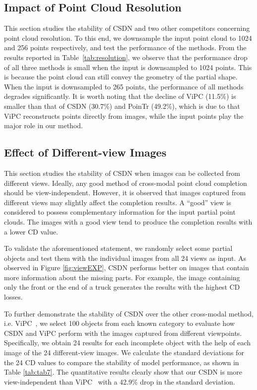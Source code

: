 \subsection{Impact of Point Cloud Resolution}
This section studies the stability of CSDN and two other competitors concerning point cloud resolution. 
To this end, we downsample the input point cloud to 1024 and 256 points respectively, and test the performance of the methods. From the results reported in Table~\ref{tab:resolution}, we observe that the performance drop of all three methods is small when the input is downsampled to 1024 points. This is because the point cloud can still convey the geometry of the partial shape. When the input is downsampled to 265 points, the performance of all methods degrades significantly. It is worth noting that the decline of ViPC (11.5\%) is smaller than that of CSDN (30.7\%) and PoinTr (49.2\%), which is due to that ViPC reconstructs points directly from images, while the input points play the major role in our method.

\subsection{Effect of Different-view Images}
\label{viewEXP}
This section studies the stability of CSDN when images can be collected from different views. Ideally, any good method of cross-modal point cloud completion should be view-independent. However, it is observed that images captured from different views may slightly affect the completion results. A ``good” view is considered to possess complementary information for the input partial point clouds. The images with a good view tend to produce the completion results with a lower CD value.

To validate the aforementioned statement, we randomly select some partial objects and test them with the individual images from all 24 views as input. As observed in Figure \ref{fig:viewEXP}, CSDN performs better on images that contain more information about the missing parts. 
For example, the image containing only the front or the end of a truck generates the results with the highest CD losses. 

To further demonstrate the stability of CSDN over the other cross-modal method, i.e. ViPC~\cite{zhang2021view}, we select 100 objects from each known category to evaluate how CSDN and ViPC perform with the images captured from different viewpoints. 
Specifically, we obtain 24 results for each incomplete object with the help of each image of the 24 different-view images.  We calculate the standard deviations for the 24 CD values to compare the stability of model performance, as shown in Table \ref{tab:tab7}.
The quantitative results clearly show that our CSDN  
is more view-independent than ViPC~\cite{zhang2021view} with a 42.9\% drop in the standard deviation.

